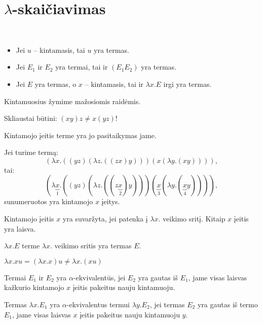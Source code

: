\chapter{$\lambda$-skaičiavimas}

\begin{defn}
  \hfill \\
  \begin{itemize}
    \item Jei $u$ – kintamasis, tai $u$ yra termas.
    \item Jei $E_{1}$ ir $E_{2}$ yra termai, tai ir $(E_{1}E_{2})$ yra 
      termas.
    \item Jei $E$ yra termas, o $x$ – kintamasis, tai ir 
      $\lambda x.E$ irgi yra termas.
  \end{itemize}
  \begin{note}
    Kintamuosius žymime mažosiomis raidėmis.
  \end{note}
  \begin{note}
    Skliaustai būtini: $(xy)z \not = x(yz)$!
  \end{note}
\end{defn}

Kintamojo įeitis terme yra jo pasitaikymas jame.
\begin{exmp}
  Jei turime termą:
  \[
  (\lambda x.((yz)(\lambda z.((zx)y)))(x(\lambda y.(xy)))),
  \]
  tai:
  \[
  (\lambda \underbrace{x}_{1}.((yz)
  (\lambda z.((z\underbrace{x}_{2})y)))
  (\underbrace{x}_{3}(\lambda y.(\underbrace{x}_{4}y)))),
  \]
  sunumeruotos yra kintamojo $x$ įeitys.
\end{exmp}

Kintamojo įeitis $x$ yra suvaržyta, jei patenka į $\lambda x.$ veikimo
sritį. Kitaip $x$ įeitis yra laisva.
\begin{note}
  $\lambda x.E$ terme $\lambda x.$ veikimo sritis yra termas $E$.
\end{note}
\begin{note}
  $\lambda x.xu = (\lambda x.x)u \not = \lambda x.(xu)$ 
\end{note}

Termai $E_{1}$ ir $E_{2}$ yra $\alpha$-ekvivalentūs, jei $E_{2}$ yra
gautas iš $E_{1}$, jame visas laisvas kažkurio kintamojo $x$ įeitis
pakeitus nauju kintamuoju.

Termas $\lambda x.E_{1}$ yra $\alpha$-ekvivalentus termui 
$\lambda y.E_{2}$, jei termas $E_{2}$ yra gautas iš termo $E_{1}$, jame
visas  laisvas $x$ įeitis pakeitus nauju kintamuoju $y$.

